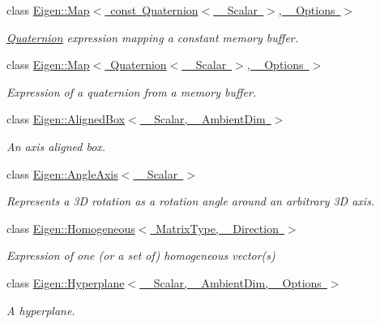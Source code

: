 \begin{DoxyCompactItemize}
\item 
class \mbox{\hyperlink{class_eigen_1_1_map_3_01const_01_quaternion_3_01___scalar_01_4_00_01___options_01_4}{Eigen\+::\+Map$<$ const Quaternion$<$ \+\_\+\+Scalar $>$, \+\_\+\+Options $>$}}
\begin{DoxyCompactList}\small\item\em \mbox{\hyperlink{class_eigen_1_1_quaternion}{Quaternion}} expression mapping a constant memory buffer. \end{DoxyCompactList}\item 
class \mbox{\hyperlink{class_eigen_1_1_map_3_01_quaternion_3_01___scalar_01_4_00_01___options_01_4}{Eigen\+::\+Map$<$ Quaternion$<$ \+\_\+\+Scalar $>$, \+\_\+\+Options $>$}}
\begin{DoxyCompactList}\small\item\em Expression of a quaternion from a memory buffer. \end{DoxyCompactList}\item 
class \mbox{\hyperlink{class_eigen_1_1_aligned_box}{Eigen\+::\+Aligned\+Box$<$ \+\_\+\+Scalar, \+\_\+\+Ambient\+Dim $>$}}
\begin{DoxyCompactList}\small\item\em An axis aligned box. \end{DoxyCompactList}\item 
class \mbox{\hyperlink{class_eigen_1_1_angle_axis}{Eigen\+::\+Angle\+Axis$<$ \+\_\+\+Scalar $>$}}
\begin{DoxyCompactList}\small\item\em Represents a 3D rotation as a rotation angle around an arbitrary 3D axis. \end{DoxyCompactList}\item 
class \mbox{\hyperlink{class_eigen_1_1_homogeneous}{Eigen\+::\+Homogeneous$<$ Matrix\+Type, \+\_\+\+Direction $>$}}
\begin{DoxyCompactList}\small\item\em Expression of one (or a set of) homogeneous vector(s) \end{DoxyCompactList}\item 
class \mbox{\hyperlink{class_eigen_1_1_hyperplane}{Eigen\+::\+Hyperplane$<$ \+\_\+\+Scalar, \+\_\+\+Ambient\+Dim, \+\_\+\+Options $>$}}
\begin{DoxyCompactList}\small\item\em A hyperplane. \end{DoxyCompactList}\item 

\end{DoxyCompactItemize}
